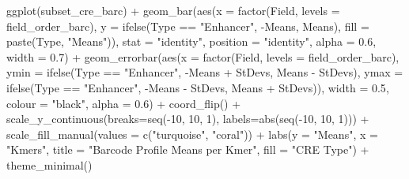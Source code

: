 \documentclass[
  letterpaper,
  DIV=11,
  numbers=noendperiod]{scrartcl}
\newenvironment{Shaded}{\begin{snugshade}}{\end{snugshade}}
\newcommand{\AttributeTok}[1]{\textcolor[rgb]{0.40,0.45,0.13}{#1}}
\newcommand{\DecValTok}[1]{\textcolor[rgb]{0.68,0.00,0.00}{#1}}
\newcommand{\FloatTok}[1]{\textcolor[rgb]{0.68,0.00,0.00}{#1}}
\newcommand{\FunctionTok}[1]{\textcolor[rgb]{0.28,0.35,0.67}{#1}}
\newcommand{\NormalTok}[1]{\textcolor[rgb]{0.00,0.23,0.31}{#1}}
\newcommand{\SpecialCharTok}[1]{\textcolor[rgb]{0.37,0.37,0.37}{#1}}
\newcommand{\StringTok}[1]{\textcolor[rgb]{0.13,0.47,0.30}{#1}}
\begin{document}
\begin{Shaded}
\begin{Highlighting}[]
\FunctionTok{ggplot}\NormalTok{(subset\_cre\_barc) }\SpecialCharTok{+}
  \FunctionTok{geom\_bar}\NormalTok{(}\FunctionTok{aes}\NormalTok{(}\AttributeTok{x =} \FunctionTok{factor}\NormalTok{(Field, }\AttributeTok{levels =}\NormalTok{ field\_order\_barc), }
               \AttributeTok{y =} \FunctionTok{ifelse}\NormalTok{(Type }\SpecialCharTok{==} \StringTok{"Enhancer"}\NormalTok{, }\SpecialCharTok{{-}}\NormalTok{Means, Means), }
                          \AttributeTok{fill =} \FunctionTok{paste}\NormalTok{(Type, }\StringTok{"Means"}\NormalTok{)),}
               \AttributeTok{stat =} \StringTok{"identity"}\NormalTok{, }\AttributeTok{position =} \StringTok{"identity"}\NormalTok{, }
               \AttributeTok{alpha =} \FloatTok{0.6}\NormalTok{, }\AttributeTok{width =} \FloatTok{0.7}\NormalTok{) }\SpecialCharTok{+}
  \FunctionTok{geom\_errorbar}\NormalTok{(}\FunctionTok{aes}\NormalTok{(}\AttributeTok{x =} \FunctionTok{factor}\NormalTok{(Field, }\AttributeTok{levels =}\NormalTok{ field\_order\_barc),}
                    \AttributeTok{ymin =} \FunctionTok{ifelse}\NormalTok{(Type }\SpecialCharTok{==} \StringTok{"Enhancer"}\NormalTok{,}
                                  \SpecialCharTok{{-}}\NormalTok{Means }\SpecialCharTok{+}\NormalTok{ StDevs, Means }\SpecialCharTok{{-}}\NormalTok{ StDevs),}
                    \AttributeTok{ymax =} \FunctionTok{ifelse}\NormalTok{(Type }\SpecialCharTok{==} \StringTok{"Enhancer"}\NormalTok{,}
                                  \SpecialCharTok{{-}}\NormalTok{Means }\SpecialCharTok{{-}}\NormalTok{ StDevs, Means }\SpecialCharTok{+}\NormalTok{ StDevs)),}
                \AttributeTok{width =} \FloatTok{0.5}\NormalTok{, }\AttributeTok{colour =} \StringTok{"black"}\NormalTok{, }\AttributeTok{alpha =} \FloatTok{0.6}\NormalTok{) }\SpecialCharTok{+}
  \FunctionTok{coord\_flip}\NormalTok{() }\SpecialCharTok{+}
  \FunctionTok{scale\_y\_continuous}\NormalTok{(}\AttributeTok{breaks=}\FunctionTok{seq}\NormalTok{(}\SpecialCharTok{{-}}\DecValTok{10}\NormalTok{, }\DecValTok{10}\NormalTok{, }\DecValTok{1}\NormalTok{), }\AttributeTok{labels=}\FunctionTok{abs}\NormalTok{(}\FunctionTok{seq}\NormalTok{(}\SpecialCharTok{{-}}\DecValTok{10}\NormalTok{, }\DecValTok{10}\NormalTok{, }\DecValTok{1}\NormalTok{))) }\SpecialCharTok{+}
  \FunctionTok{scale\_fill\_manual}\NormalTok{(}\AttributeTok{values =} \FunctionTok{c}\NormalTok{(}\StringTok{"turquoise"}\NormalTok{, }\StringTok{"coral"}\NormalTok{)) }\SpecialCharTok{+}
  \FunctionTok{labs}\NormalTok{(}\AttributeTok{y =} \StringTok{"Means"}\NormalTok{, }\AttributeTok{x =} \StringTok{"Kmers"}\NormalTok{, }
       \AttributeTok{title =} \StringTok{"Barcode Profile Means per Kmer"}\NormalTok{, }
       \AttributeTok{fill =} \StringTok{"CRE Type"}\NormalTok{) }\SpecialCharTok{+}
  \FunctionTok{theme\_minimal}\NormalTok{()}
\end{Highlighting}
\end{Shaded}
\end{document}

